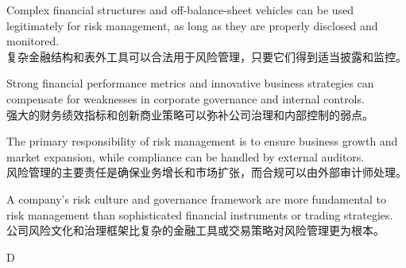 \documentclass{article}
\begin{document}
    \begin{choices}
        \item Complex financial structures and off-balance-sheet vehicles can be used legitimately for risk management, as long as they are properly disclosed and monitored. \\
        复杂金融结构和表外工具可以合法用于风险管理，只要它们得到适当披露和监控。
    
        \item Strong financial performance metrics and innovative business strategies can compensate for weaknesses in corporate governance and internal controls. \\
        强大的财务绩效指标和创新商业策略可以弥补公司治理和内部控制的弱点。
    
        \item The primary responsibility of risk management is to ensure business growth and market expansion, while compliance can be handled by external auditors. \\
        风险管理的主要责任是确保业务增长和市场扩张，而合规可以由外部审计师处理。
    
        \item A company's risk culture and governance framework are more fundamental to risk management than sophisticated financial instruments or trading strategies. \\
        公司风险文化和治理框架比复杂的金融工具或交易策略对风险管理更为根本。
    \end{choices}
    
    \begin{correctanswer}
        D
    \end{correctanswer}
    
\end{document}
